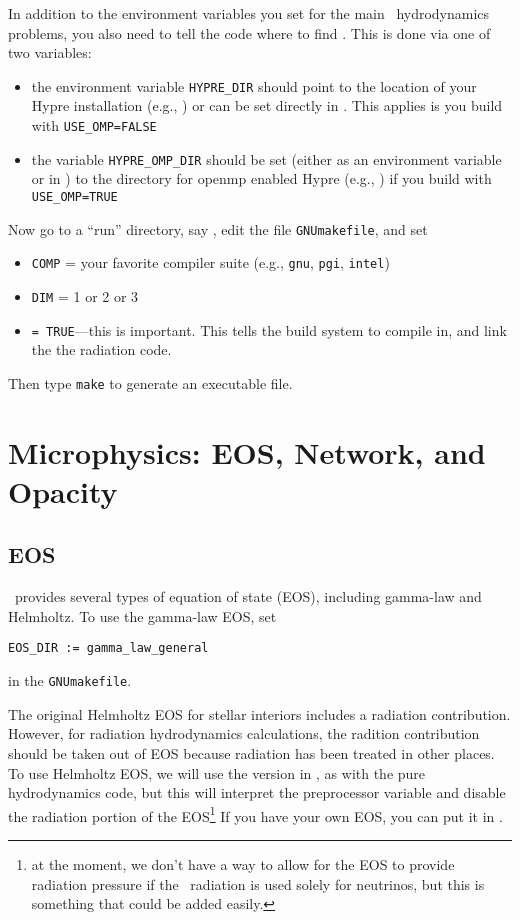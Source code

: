 In addition to the environment variables you set for the main
\castro\ hydrodynamics problems, you also need to tell the code
where to find \hypre.  This is done via one of two variables:
\begin{itemize}
\item the environment variable {\tt HYPRE\_DIR} should
  point to the location of your Hypre installation
  (e.g., {\tt{}}) or
  can be set directly in 
  {\tt{}}.
  This applies is you build with {\tt USE\_OMP=FALSE}

\item the variable {\tt HYPRE\_OMP\_DIR} should be set (either as an
  environment variable or in
  {\tt{}}) to the directory
  for openmp enabled Hypre (e.g.,
  {\tt{}}) if you build with {\tt
    USE\_OMP=TRUE}
\end{itemize}

Now go to a ``run'' directory, say
{\tt{}},
edit the file {\tt GNUmakefile}, and set
\begin{itemize}
\item {\tt COMP} = your favorite compiler suite (e.g., {\tt gnu}, {\tt pgi}, {\tt intel})
\item {\tt DIM}   = 1 or 2 or 3
\item {} {\tt = TRUE}---this is important.  This tells the build system to
  compile in, and link the the radiation code.
\end{itemize}
Then type {\tt make} to generate an executable file.

\section{Microphysics: EOS, Network, and Opacity}

\subsection{EOS}

\castro\ provides several types of equation of state (EOS), including
gamma-law and Helmholtz.  To use the gamma-law EOS, set
\begin{verbatim}
EOS_DIR := gamma_law_general
\end{verbatim}
in the {\tt GNUmakefile}.

The original Helmholtz EOS for stellar interiors includes a radiation
contribution.  However, for radiation hydrodynamics calculations, the
radition contribution should be taken out of EOS because radiation has
been treated in other places.  To use Helmholtz EOS, we will use the
version in \microphysics, as with the pure hydrodynamics code, but
this will interpret the  preprocessor variable and
disable the radiation portion of the EOS\footnote{at the moment, we
  don't have a way to allow for the EOS to provide radiation pressure
  if the \castro\ radiation is used solely for neutrinos, but this is
  something that could be added easily.}  If you have your own EOS, you
can put it in \microphysics.


